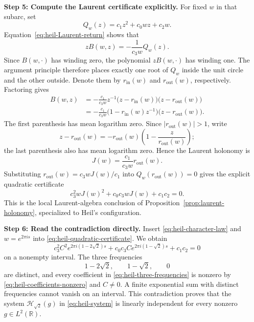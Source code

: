 \documentclass[reqno]{amsart}
\theoremstyle{remark}
\numberwithin{equation}{section}
\newcommand{\R}{\mathbb{R}}
\begin{document}
\smallskip
\noindent
\textbf{Step 5: Compute the Laurent certificate explicitly.}
For fixed \(w\) in that subarc, set
\begin{equation}
  Q_w(z)=c_1z^2+c_0wz+c_2w.
  \label{eq:heil-Q}
\end{equation}
Equation~\eqref{eq:heil-Laurent-return} shows that
\[
  zB(w,z)=-\frac{1}{c_3w}Q_w(z).
\]
Since \(B(w,\cdot)\) has winding zero, the polynomial
\(zB(w,\cdot)\) has winding one. The argument principle therefore places
exactly one root of \(Q_w\) inside the unit circle and the other outside.
Denote them by \(r_{\mathrm{in}}(w)\) and
\(r_{\mathrm{out}}(w)\), respectively. Factoring gives
\begin{align*}
  B(w,z)
  &=-\frac{c_1}{c_3w}z^{-1}
    \bigl(z-r_{\mathrm{in}}(w)\bigr)
    \bigl(z-r_{\mathrm{out}}(w)\bigr)\\
  &=-\frac{c_1}{c_3w}
    \bigl(1-r_{\mathrm{in}}(w)z^{-1}\bigr)
    \bigl(z-r_{\mathrm{out}}(w)\bigr).
\end{align*}
The first parenthesis has mean logarithm zero. Since
\(|r_{\mathrm{out}}(w)|>1\), write
\[
  z-r_{\mathrm{out}}(w)
  =-r_{\mathrm{out}}(w)
   \left(1-\frac{z}{r_{\mathrm{out}}(w)}\right);
\]
the last parenthesis also has mean logarithm zero. Hence the Laurent holonomy
is
\begin{equation}
  J(w)=\frac{c_1}{c_3w}r_{\mathrm{out}}(w).
  \label{eq:heil-J-root}
\end{equation}
Substituting
\(r_{\mathrm{out}}(w)=c_3wJ(w)/c_1\) into
\(Q_w(r_{\mathrm{out}}(w))=0\) gives the explicit quadratic certificate
\begin{equation}
  c_3^2wJ(w)^2+c_0c_3wJ(w)+c_1c_2=0.
  \label{eq:heil-quadratic-certificate}
\end{equation}
This is the local Laurent-algebra conclusion of
Proposition~\ref{prop:laurent-holonomy}, specialized to Heil's configuration.

\smallskip
\noindent
\textbf{Step 6: Read the contradiction directly.}
Insert \eqref{eq:heil-character-law} and \(w=e^{2\pi is}\) into
\eqref{eq:heil-quadratic-certificate}. We obtain
\begin{equation}
  c_3^2C^2e^{2\pi i(1-2\sqrt2)s}
  +c_0c_3Ce^{2\pi i(1-\sqrt2)s}
  +c_1c_2=0
  \label{eq:heil-three-frequencies}
\end{equation}
on a nonempty interval. The three frequencies
\[
  1-2\sqrt2,\qquad 1-\sqrt2,\qquad 0
\]
are distinct, and every coefficient in
\eqref{eq:heil-three-frequencies} is nonzero by
\eqref{eq:heil-coefficients-nonzero} and \(C\neq0\). A finite exponential
sum with distinct frequencies cannot vanish on an interval. This
contradiction proves that the system \(\mathcal H_{\sqrt2}(g)\) in
\eqref{eq:heil-system} is linearly independent for every nonzero
\(g\in L^2(\R)\).
\end{document}
